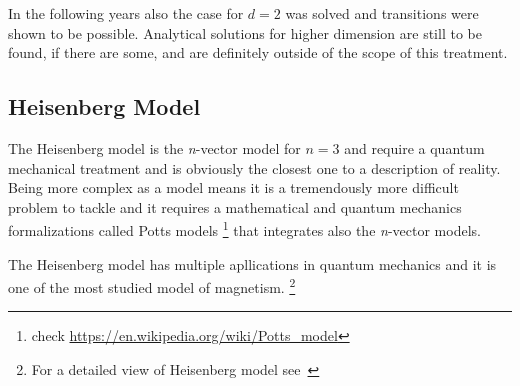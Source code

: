 In the following years also the case for $d=2$ was solved and transitions were
shown to be possible. Analytical solutions for higher dimension are still to be
found, if there are some, and are definitely outside of the scope of this
treatment. 


\subsection{Heisenberg Model}

The Heisenberg model is the \textit{n}-vector model for $n=3$ and require a quantum
mechanical treatment and is obviously the closest one to a description of reality.
Being more complex as a model means it is a tremendously more difficult problem to 
tackle and it requires a mathematical and quantum mechanics formalizations called 
Potts models \footnote{check \url{https://en.wikipedia.org/wiki/Potts_model}} that
integrates also the \textit{n}-vector models.

The Heisenberg model has multiple apllications in quantum mechanics and it is one
of the most studied model of magnetism. \footnote{For a detailed view of Heisenberg
model see~\textcite{Nolting2009}} 
